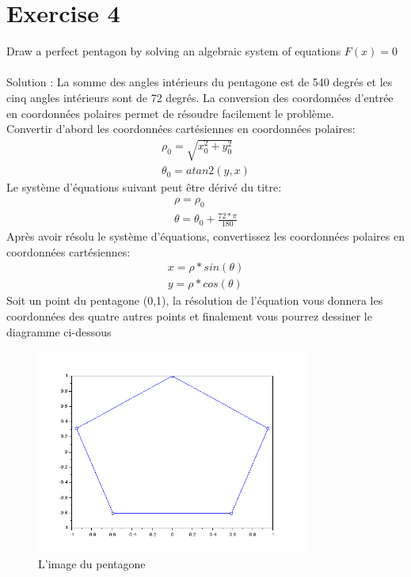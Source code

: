\documentclass[11pt]{article}
\begin{document}
    \section*{Exercise 4}
    Draw a perfect pentagon by solving an algebraic system of equations $F(x) = 0$\\
    ~\\
    Solution :
    La somme des angles intérieurs du pentagone est de 540 degrés et les cinq angles intérieurs sont de 72 degrés. La conversion des coordonnées d'entrée en coordonnées polaires permet de résoudre facilement le problème.\\
    Convertir d'abord les coordonnées cartésiennes en coordonnées polaires:
    $$
    \begin{matrix}
        \rho_0=\sqrt{x_0^2+y_0^2}\\
        \theta_0=atan2(y,x)
    \end{matrix}
    $$
    Le système d'équations suivant peut être dérivé du titre:
    $$
    \begin{matrix}
        \rho=\rho_0\\
        \theta=\theta_0+\frac{72*\pi}{180}
    \end{matrix}
    $$
    Après avoir résolu le système d'équations, convertissez les coordonnées polaires en coordonnées cartésiennes:
    $$
    \begin{matrix}
        x=\rho*sin(\theta)\\
        y=\rho*cos(\theta)
    \end{matrix}
    $$
    Soit un point du pentagone (0,1), la résolution de l'équation vous donnera les coordonnées des quatre autres points et finalement vous pourrez dessiner le diagramme ci-dessous
    \begin{figure}[H]
        \centering
        \includegraphics[width=0.8\textwidth,height=0.5\textwidth]{pen}
        \caption{L'image du pentagone}
    \end{figure}
\end{document}

